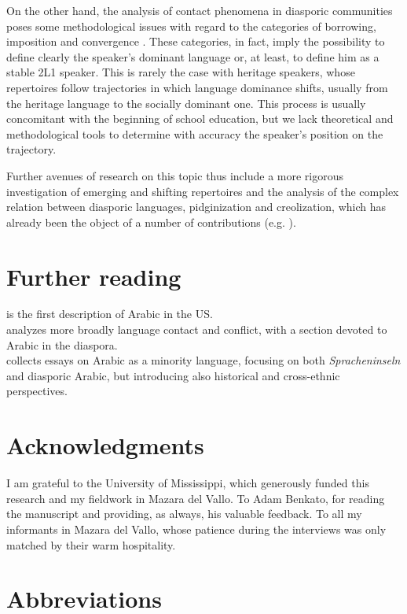 \documentclass[output=paper]{langsci/langscibook}
\begin{document}
On the other hand, the analysis of contact phenomena in diasporic communities poses some methodological issues with regard to the categories of borrowing, imposition and convergence \citep{VanCoetsem1988,VanCoetsem2000}. These categories, in fact, imply the possibility to define clearly the speaker’s dominant language or, at least, to define him as a stable 2L1 speaker. This is rarely the case with heritage speakers, whose repertoires follow trajectories in which language dominance shifts, usually from the heritage language to the socially dominant one. This process is usually concomitant with the beginning of school education, but we lack theoretical and methodological tools to determine with accuracy the speaker’s position on the trajectory.

Further avenues of research on this topic thus include a more rigorous investigation of emerging and shifting repertoires and the analysis of the complex relation between diasporic languages, pidginization and creolization, which has already been the object of a number of contributions (e.g. \citealt{GonzoSaltarelli1983,Romaine1989}).

\section*{Further reading}

 \citet{Rouchdy_arabic_1992} is the first description of Arabic in the US.\\
 \citet{Rouchdy2002} analyzes more broadly language contact and conflict, with a section devoted to Arabic in the diaspora.\\
 \citet{Owens2000editor} collects essays on Arabic as a minority language, focusing on both \textit{Spracheninseln} and diasporic Arabic, but introducing also historical and cross-ethnic perspectives.
 
 \section*{Acknowledgments}
I am grateful to the University of Mississippi, which generously funded this research and my fieldwork in Mazara del Vallo. To Adam Benkato, for reading the manuscript and providing, as always, his valuable feedback. To all my informants in Mazara del Vallo, whose patience during the interviews was only matched by their warm hospitality.
 
 \section*{Abbreviations}
\end{document}
